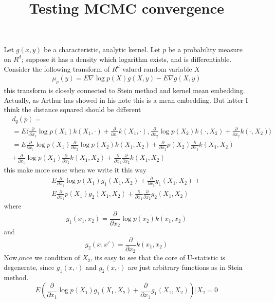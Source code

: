 \documentclass{article}
\title{Testing MCMC convergence}
\author{}
\date{}
\begin{document}
\maketitle




Let $g(x,y)$ be a characteristic, analytic kernel. Let $p$ be a probability measure on $R^d$; suppose it has a density which logarithm exists, and is differentiable. Consider the following transform of $R^d$ valued random variable $X$
\begin{align}
 \mu_p(y) = E  \nabla \log p(X) g(X,y) - E \nabla g(X,y)
\end{align}
this transform is closely connected to Stein method and kernel mean embedding. Actually, as Arthur has showed in his note this is a mean embedding. But latter I think the distance squared should be different
\begin{align}
&d_q(p) = \\
&= E \langle   \frac{\partial } {\partial x_1} \log p(X_1) k(X_1,\cdot) + \frac{\partial } {\partial x_1} k(X_1,\cdot) ,  \frac{\partial }{\partial x_2} \log p(X_2) k(\cdot,X_2) +  \frac{\partial } {\partial x_2} k(\cdot,X_2) \rangle \\
  &= E  \frac{\partial } {\partial x_1} \log p(X_1) \frac{\partial } {\partial x_2} \log p(X_2) k(X_1,X_2) +
          \frac{\partial } {\partial x_2} p(X_2) \frac{\partial } {\partial x_1} k(X_1,X_2) \\
  &+  \frac{\partial } {\partial x_1} \log p(X_1) \frac{\partial } {\partial x_2} k(X_1,X_2) + \frac{\partial } {\partial x_1}\frac{\partial } {\partial x_2} k(X_1,X_2)
\end{align}
this make more sense when we write it this way
\begin{align}
 E \frac{\partial } {\partial x_1} \log p(X_1) g_1(X_1,X_2) + \frac{\partial } {\partial x_1} g_1(X_1,X_2) + \\
 E \frac{\partial } {\partial x_1} p(X_1) g_2(X_1,X_2) +  \frac{\partial } {\partial x_1}\frac{\partial } {\partial x_2} g_2(X_1,X_2)
\end{align}
where 
$$
g_1(x_1,x_2) = \frac{\partial } {\partial x_2} \log p(x_2) k(x_1,x_2)
$$
and
$$
g_2(x,x') = \frac{\partial } {\partial x_2} k(x_1,x_2)
$$
Now,once we condition of $X_2$,  its easy to see that the core of U-statistic is degenerate, since $g_1(x,\cdot)$ and $g_2(x,\cdot)$ are just arbitrary functions as in Stein method.  
$$
E \left (\frac{\partial } {\partial x_1} \log p(X_1) g_1(X_1,X_2) + \frac{\partial } {\partial x_1} g_1(X_1,X_2) \right )| X_2 = 0
$$
\end{document}
